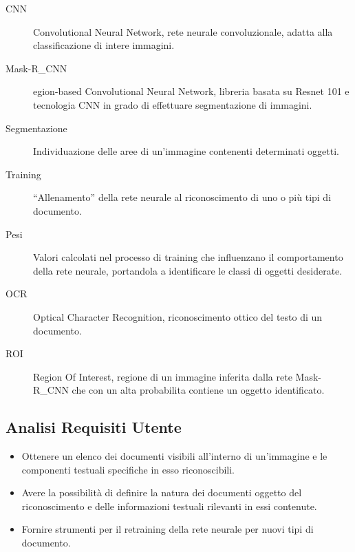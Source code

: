 \documentclass[12pt,a4paper]{article}
\begin{document}
\begin{description}
    \item[CNN] Convolutional Neural Network, rete neurale
        convoluzionale, adatta alla classificazione di intere immagini.

    \item[Mask-R\_CNN] egion-based Convolutional Neural Network, libreria
        basata su Resnet 101 e tecnologia CNN in grado di effettuare
        segmentazione di immagini.

    \item[Segmentazione] Individuazione delle aree di un'immagine
        contenenti determinati oggetti.

    \item[Training] ``Allenamento'' della rete neurale al riconoscimento
        di uno o più tipi di documento.

    \item[Pesi] Valori calcolati nel processo di training che
        influenzano il comportamento della rete neurale, portandola a
        identificare le classi di oggetti desiderate.

    \item[OCR] Optical Character Recognition, riconoscimento ottico del
        testo di un documento.

    \item[ROI] Region Of Interest, regione di un immagine inferita dalla
        rete Mask-R\_CNN che con un alta probabilita contiene un oggetto
        identificato.

\end{description}

\subsection{Analisi Requisiti Utente}

\begin{itemize}
    \item Ottenere un elenco dei documenti visibili all'interno di
        un'immagine e le componenti testuali specifiche in esso
        riconoscibili.
    \item Avere la possibilità di definire la natura dei documenti
        oggetto del riconoscimento e delle informazioni testuali
        rilevanti in essi contenute.
    \item Fornire strumenti per il retraining della rete neurale per
        nuovi tipi di documento.
\end{itemize}
\end{document}
